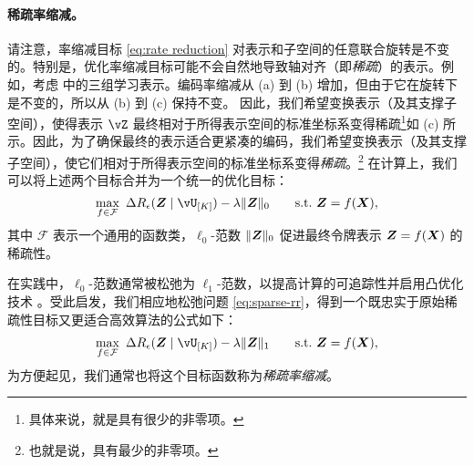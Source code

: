 \documentclass[../../book-main.tex]{subfiles}
\begin{document}
\paragraph{稀疏率缩减。} 请注意，率缩减目标 \eqref{eq:rate reduction} 对表示和子空间的任意联合旋转是不变的。特别是，优化率缩减目标可能不会自然地导致轴对齐（即\textit{稀疏}）的表示。{例如，考虑  中的三组学习表示。编码率缩减从 (a) 到 (b) 增加，但由于它在旋转下是不变的，所以从 (b) 到 (c) 保持不变。} 因此，我们希望变换表示（及其支撑子空间），使得表示 $\vZ$ 最终相对于所得表示空间的标准坐标系变得稀疏\footnote{具体来说，就是具有很少的非零项。}{如 (c) 所示}。因此，为了确保最终的表示适合更紧凑的编码，我们希望变换表示（及其支撑子空间），使它们相对于所得表示空间的标准坐标系变得\textit{稀疏}。\footnote{也就是说，具有最少的非零项。} 在计算上，我们可以将上述两个目标合并为一个统一的优化目标：
\begin{equation}
   \max_{f \in \mathcal{F}}\ \Delta R_{\epsilon}(\Z \mid \vU_{[K]}) - \lambda \|\bm{Z}\|_0 \qquad \text{s.t.}\ \Z = f(\X),
   \label{eq:sparse-rr}
\end{equation}
其中 $\mathcal{F}$ 表示一个通用的函数类，$\ell_0$-范数 $\|\bm{Z}\|_0$ 促进最终令牌表示 \(\bm{Z} = f(\bm{X})\) 的稀疏性。%


在实践中，$\ell_0$-范数通常被松弛为 $\ell_1$-范数，以提高计算的可追踪性并启用凸优化技术 \cite{Wright-Ma-2022}。受此启发，我们相应地松弛问题 \eqref{eq:sparse-rr}，得到一个既忠实于原始稀疏性目标又更适合高效算法的公式如下：
\begin{equation}
\begin{aligned}
   \max_{f \in \mathcal{F}}\    \Delta R_{\epsilon}(\Z \mid \vU_{[K]}) - \lambda \|\bm{Z}\|_1  \qquad \text{s.t.}\ \Z = f(\X),
   \label{eq:sparse-rr-1}
\end{aligned}
\end{equation}
为方便起见，我们通常也将这个目标函数称为\textit{稀疏率缩减}。
\end{document}
